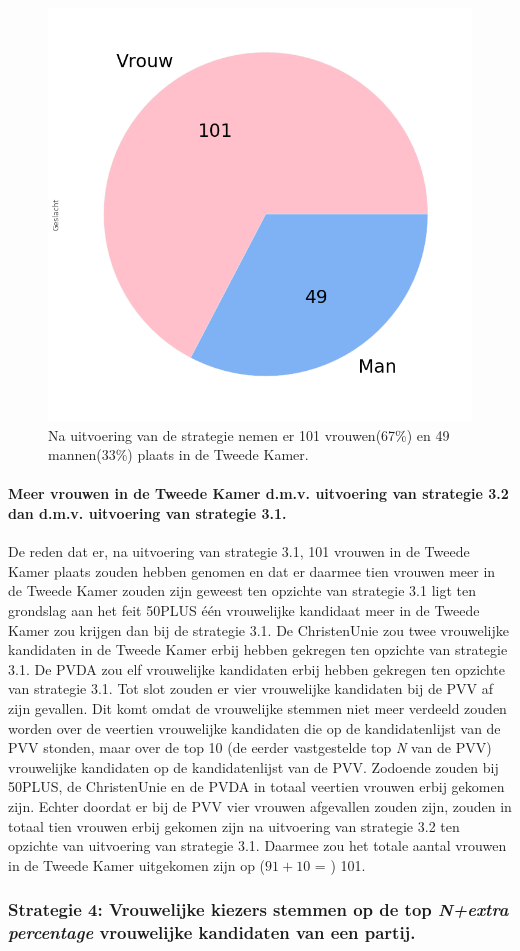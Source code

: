 \begin{figure}[H]
\centering
	\includegraphics[width=0.35\linewidth]{pie_chart_eigenX.png}

			\caption{Na uitvoering van de strategie nemen er 101 vrouwen(67\%) en 49 mannen(33\%) plaats in de Tweede Kamer.}

\label{fig:pcS32V}
\end{figure}

\paragraph{Meer vrouwen in de Tweede Kamer d.m.v. uitvoering van strategie 3.2 dan d.m.v. uitvoering van strategie 3.1.}
De reden dat er, na uitvoering van strategie 3.1, 101 vrouwen in de Tweede Kamer plaats zouden hebben genomen en dat er daarmee tien vrouwen meer in de Tweede Kamer zouden zijn geweest ten opzichte van strategie 3.1 ligt ten grondslag aan het feit 50PLUS één vrouwelijke kandidaat meer in de Tweede Kamer zou krijgen dan bij de strategie 3.1. 
De ChristenUnie zou twee vrouwelijke kandidaten in de Tweede Kamer erbij hebben gekregen ten opzichte van strategie 3.1. De PVDA zou elf vrouwelijke kandidaten erbij hebben gekregen ten opzichte van strategie 3.1. Tot slot zouden er vier vrouwelijke kandidaten bij de PVV af zijn gevallen. Dit komt omdat de vrouwelijke stemmen niet meer verdeeld zouden worden over de veertien vrouwelijke kandidaten die op de kandidatenlijst van de PVV stonden, maar over de top 10 (de eerder vastgestelde top \textit{N} van de PVV) vrouwelijke kandidaten op de kandidatenlijst van de PVV. Zodoende zouden bij 50PLUS, de ChristenUnie en de PVDA in totaal veertien vrouwen erbij gekomen zijn. Echter doordat er bij de PVV vier vrouwen afgevallen zouden zijn, zouden in totaal tien vrouwen erbij gekomen zijn na uitvoering van strategie 3.2 ten opzichte van uitvoering van strategie 3.1. Daarmee zou het totale aantal vrouwen in de Tweede Kamer uitgekomen zijn op ($91+10$ = ) 101.


\subsubsection{Strategie 4: Vrouwelijke kiezers stemmen op de top \textit{N+extra percentage} vrouwelijke kandidaten van een partij.}

